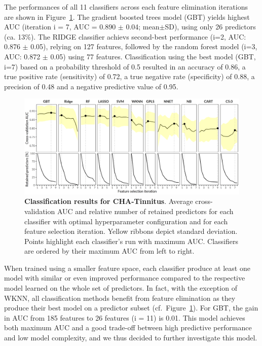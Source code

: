 \documentclass[
  oneside]{book}
\begin{document}
The performances of all 11 classifiers across each feature elimination iterations are shown in Figure~\ref{fig:09-results-pone}.
The gradient boosted trees model (GBT) yields highest AUC (iteration i = 7, AUC = 0.890 \(\pm\) 0.04; mean\(\pm\)SD), using only 26 predictors (ca. 13\%).
The RIDGE classifier achievs second-best performance (i=2, AUC: 0.876 \(\pm\) 0.05), relying on 127 features, followed by the random forest model (i=3, AUC: 0.872 \(\pm\) 0.05) using 77 features.
Classification using the best model (GBT, i=7) based on a probability threshold of 0.5 resulted in an accuracy of 0.86, a true positive rate (sensitivity) of 0.72, a true negative rate (specificity) of 0.88, a precision of 0.48 and a negative predictive value of 0.95.



\begin{figure}[h]

{\centering \includegraphics[width=1\linewidth]{figures/09-results-pone} 

}

\caption{\textbf{Classification results for CHA-Tinnitus}. Average cross-validation AUC and relative number of retained predictors for each classifier with optimal hyperparameter configuration and for each feature selection iteration. Yellow ribbons depict standard deviation. Points highlight each classifier's run with maximum AUC. Classifiers are ordered by their maximum AUC from left to right.}\label{fig:09-results-pone}
\end{figure}

When trained using a smaller feature space, each classifier produce at least one model with similar or even improved performance compared to the respective model learned on the whole set of predictors.
In fact, with the exception of WKNN, all classification methods benefit from feature elimination as they produce their best model on a predictor subset (cf.~Figure~\ref{fig:09-results-pone}).
For GBT, the gain in AUC from 185 features to 26 features (i = 11) is 0.01.
This model achieves both maximum AUC and a good trade-off between high predictive performance and low model complexity, and we thus decided to further investigate this model.
\end{document}
